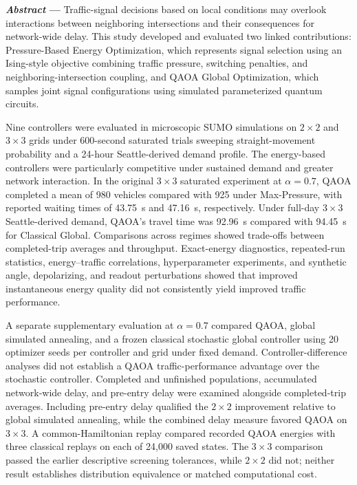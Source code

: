 \textbf{\emph{Abstract} ---}
Traffic-signal decisions based on local conditions may overlook interactions between neighboring intersections and their consequences for network-wide delay. This study developed and evaluated two linked contributions: Pressure-Based Energy Optimization, which represents signal selection using an Ising-style objective combining traffic pressure, switching penalties, and neighboring-intersection coupling, and QAOA Global Optimization, which samples joint signal configurations using simulated parameterized quantum circuits.

Nine controllers were evaluated in microscopic SUMO simulations on $2\times2$ and $3\times3$ grids under 600-second saturated trials sweeping straight-movement probability and a 24-hour Seattle-derived demand profile. The energy-based controllers were particularly competitive under sustained demand and greater network interaction. In the original $3\times3$ saturated experiment at $\alpha=0.7$, QAOA completed a mean of 980 vehicles compared with 925 under Max-Pressure, with reported waiting times of 43.75~s and 47.16~s, respectively. Under full-day $3\times3$ Seattle-derived demand, QAOA's travel time was 92.96~s compared with 94.45~s for Classical Global. Comparisons across regimes showed trade-offs between completed-trip averages and throughput. Exact-energy diagnostics, repeated-run statistics, energy--traffic correlations, hyperparameter experiments, and synthetic angle, depolarizing, and readout perturbations showed that improved instantaneous energy quality did not consistently yield improved traffic performance.

A separate supplementary evaluation at $\alpha=0.7$ compared QAOA, global simulated annealing, and a frozen classical stochastic global controller using 20 optimizer seeds per controller and grid under fixed demand. Controller-difference analyses did not establish a QAOA traffic-performance advantage over the stochastic controller. Completed and unfinished populations, accumulated network-wide delay, and pre-entry delay were examined alongside completed-trip averages. Including pre-entry delay qualified the $2\times2$ improvement relative to global simulated annealing, while the combined delay measure favored QAOA on $3\times3$. A common-Hamiltonian replay compared recorded QAOA energies with three classical replays on each of 24,000 saved states. The $3\times3$ comparison passed the earlier descriptive screening tolerances, while $2\times2$ did not; neither result establishes distribution equivalence or matched computational cost.

